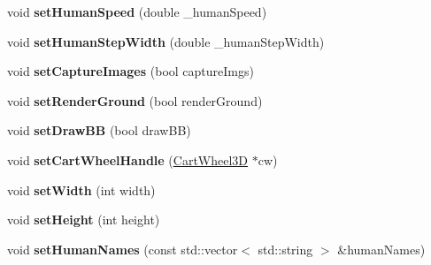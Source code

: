\begin{DoxyCompactItemize}
\item 
\hypertarget{classCartWheel_1_1Visualization_a9850cf8cce540ffa656d68795cb9163e}{
void {\bfseries setHumanSpeed} (double \_\-humanSpeed)}
\label{classCartWheel_1_1Visualization_a9850cf8cce540ffa656d68795cb9163e}

\item 
\hypertarget{classCartWheel_1_1Visualization_acf5cde65bf57f006509e30a84b2de13d}{
void {\bfseries setHumanStepWidth} (double \_\-humanStepWidth)}
\label{classCartWheel_1_1Visualization_acf5cde65bf57f006509e30a84b2de13d}

\item 
\hypertarget{classCartWheel_1_1Visualization_a6fc2e1c012803ae9bf5d84ab37ca359e}{
void {\bfseries setCaptureImages} (bool captureImgs)}
\label{classCartWheel_1_1Visualization_a6fc2e1c012803ae9bf5d84ab37ca359e}

\item 
\hypertarget{classCartWheel_1_1Visualization_a9ade1e4b14fc19be416200b20589676f}{
void {\bfseries setRenderGround} (bool renderGround)}
\label{classCartWheel_1_1Visualization_a9ade1e4b14fc19be416200b20589676f}

\item 
\hypertarget{classCartWheel_1_1Visualization_aa7d0f677f1a34e0f83d91f5f8a95906f}{
void {\bfseries setDrawBB} (bool drawBB)}
\label{classCartWheel_1_1Visualization_aa7d0f677f1a34e0f83d91f5f8a95906f}

\item 
\hypertarget{classCartWheel_1_1Visualization_a914ef85f4f0d02ddffc42d27370317ff}{
void {\bfseries setCartWheelHandle} (\hyperlink{classCartWheel_1_1CartWheel3D}{CartWheel3D} $\ast$cw)}
\label{classCartWheel_1_1Visualization_a914ef85f4f0d02ddffc42d27370317ff}

\item 
\hypertarget{classCartWheel_1_1Visualization_afbe08e3106145a072d481d46b78ebcf9}{
void {\bfseries setWidth} (int width)}
\label{classCartWheel_1_1Visualization_afbe08e3106145a072d481d46b78ebcf9}

\item 
\hypertarget{classCartWheel_1_1Visualization_aa4afec4996181d707ac10ce520093591}{
void {\bfseries setHeight} (int height)}
\label{classCartWheel_1_1Visualization_aa4afec4996181d707ac10ce520093591}

\item 
\hypertarget{classCartWheel_1_1Visualization_a8e3b84c9df97160a403900b161147616}{
void {\bfseries setHumanNames} (const std::vector$<$ std::string $>$ \&humanNames)}
\label{classCartWheel_1_1Visualization_a8e3b84c9df97160a403900b161147616}


\end{DoxyCompactItemize}

